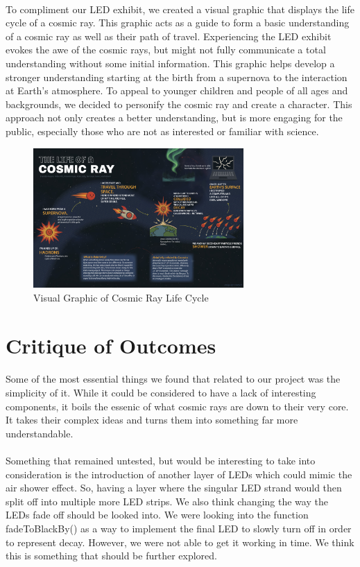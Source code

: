 \documentclass{article}
\begin{document}
\paragraph{}To compliment our LED exhibit, we created a visual graphic that displays the life cycle of a cosmic ray. This graphic acts as a guide to form a basic understanding of a cosmic ray as well as their path of travel. Experiencing the LED exhibit evokes the awe of the cosmic rays, but might not fully communicate a total understanding without some initial information. This graphic helps develop a stronger understanding starting at the birth from a supernova to the interaction at Earth’s atmosphere. To appeal to younger children and people of all ages and backgrounds, we decided to personify the cosmic ray and create a character. This approach not only creates a better understanding, but is more engaging for the public, especially those who are not as interested or familiar with science.
\begin{figure}
    \centering
    \includegraphics[width=0.7143\textwidth]{425-print.jpg}
    \caption{Visual Graphic of Cosmic Ray Life Cycle}
\end{figure}


\section{Critique of Outcomes}
\paragraph{}Some of the most essential things we found that related to our project was the simplicity of it. While it could be considered to have a lack of interesting components, it boils the essenic of what cosmic rays are down to their very core. It takes their complex ideas and turns them into something far more understandable. 
\paragraph{}Something that remained untested, but would be interesting to take into consideration is the introduction of another layer of LEDs which could mimic the air shower effect. So, having a layer where the singular LED strand would then split off into multiple more LED strips. We also think changing the way the LEDs fade off should be looked into. We were looking into the function fadeToBlackBy() as a way to implement the final LED to slowly turn off in order to represent decay. However, we were not able to get it working in time. We think this is something that should be further explored. 
\end{document}
